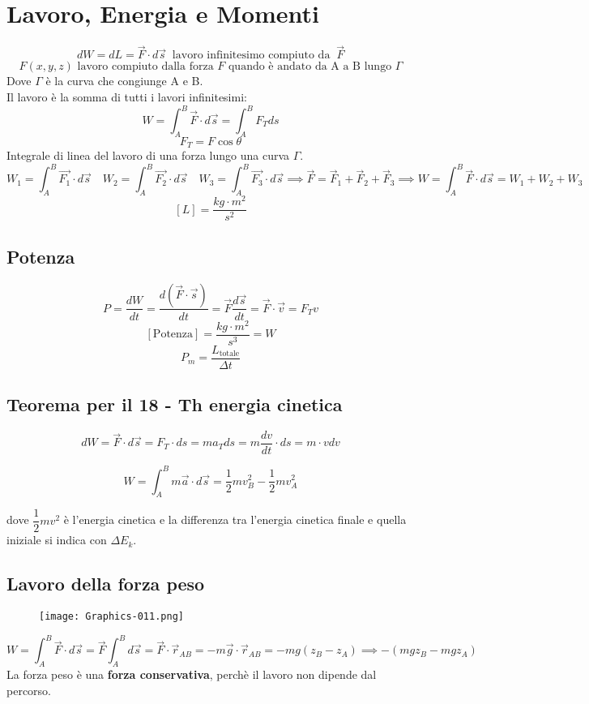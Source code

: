 \documentclass[../../main.tex]{subfiles}
\begin{document}
\section{Lavoro, Energia e Momenti}
\[
    dW = dL = \vec{F} \cdot d\vec{s} \ \text{ lavoro infinitesimo compiuto da } \ \vec{F}
\]
\[
    F(x,y,z) \text{ lavoro compiuto dalla forza $F$ quando è andato da A a B lungo } \Gamma
\]
Dove $\Gamma$ è la curva che congiunge A e B.\\
Il lavoro è la somma di tutti i lavori infinitesimi:
\[
    W = \int_{A}^{B} \vec{F} \cdot d\vec{s} = \int_{A}^{B} F_T ds
\]
\[
    F_T = F \cos \theta
\]
Integrale di linea del lavoro di una forza lungo una curva $\Gamma$.
\[
    W_1 = \int_A^B \vec{F_1} \cdot d\vec{s} \quad W_2 = \int_A^B \vec{F_2} \cdot d\vec{s} \quad W_3 = \int_A^B \vec{F_3} \cdot d\vec{s} \implies \vec F = \vec F_1 + \vec F_2 + \vec F_3 \implies W = \int_{A}^{B} \vec{F} \cdot d\vec{s} = W_1 + W_2 + W_3
\]
\[
    [L] = \dfrac{kg\cdot m^2}{s^2}
\]
\subsection{Potenza}
\[
    P = \frac{dW}{dt} = \dfrac{d(\vec F \cdot \vec s)}{dt} = \vec F \dfrac{d\vec s}{dt} = \vec F \cdot \vec v = F_T v
\]
\[
    [\text{Potenza}] = \dfrac{kg\cdot m^2}{s^3} = W
\]
\[
    P_m = \dfrac{L_{\text{totale}}}{\Delta t}
\]
\subsection{Teorema per il 18 - Th energia cinetica}
\[
    dW = \vec F\cdot d\vec s = F_T\cdot ds = ma_T ds = m\dfrac{dv}{dt}\cdot ds = m\cdot vdv
\]
\begin{mdframed}[outerlinecolor=red,outerlinewidth=1pt,linecolor=cccolor,roundcorner=10pt]
    \[
        W = \int_{A}^{B} m\vec a\cdot d\vec s = \dfrac{1}{2}mv_B^2 - \dfrac{1}{2}mv_A^2
    \]
\end{mdframed}
dove $\dfrac{1}{2} mv^2$ è l'energia cinetica e la differenza tra l'energia cinetica finale e quella iniziale si indica con $\Delta E_k$.

\subsection{Lavoro della forza peso}
\begin{figure}[H]
    \centering
    \texttt{[image: Graphics-011.png]}
\end{figure}
\[
    W = \int_{A}^{B} \vec F\cdot d\vec s = \vec F \int_{A}^{B} d\vec s = \vec F \cdot \vec r_{AB} = -m\vec g \cdot \vec r_{AB} = -mg(z_B - z_A) \implies -(mgz_B - mgz_A)
\]
La forza peso è una \textbf{forza conservativa}, perchè il lavoro non dipende dal percorso.
\end{document}
